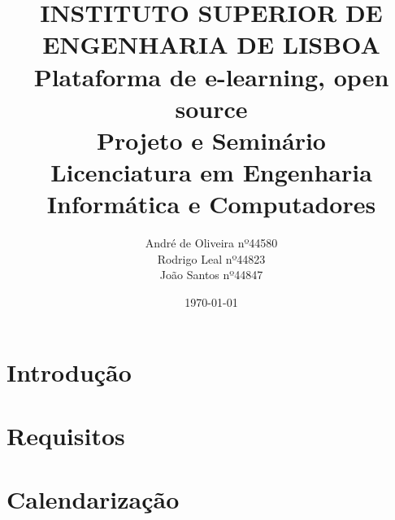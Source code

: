 \documentclass[12pt,a4paper]{article}
\def\paperid{\hfill}
\begin{document}
\title{\vskip-1.45cm
\hskip-13cm  {\small {\vskip-1.45cm{\hskip2.8cm\textbf{INSTITUTO SUPERIOR DE ENGENHARIA DE LISBOA}}}}
\vskip1.45cm
{\bf Plataforma de e-learning, open source} \\[3ex]
{\small Projeto e Seminário\\[-1ex]
 Licenciatura em Engenharia Informática e Computadores}
}
\author{ André de Oliveira nº44580\\[1ex]
 Rodrigo Leal nº44823\\[1ex]
 João Santos nº44847\\[1ex]
}
\date{\small\today}
\maketitle
\def\paperid{\hfill}

\section{Introdução}\label{section:primeiraSec}


\section{Requisitos}


\section{Calendarização}







\end{document}
